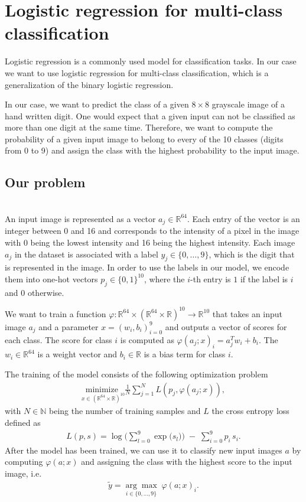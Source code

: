 \section{Logistic regression for multi-class classification}
\label{sec:mathematical-background}
Logistic regression is a commonly used model for classification tasks. In our case we want to use logistic regression for multi-class classification, which is a generalization of the binary logistic regression.

In our case, we want to predict the class of a given $8\times 8$ grayscale image of a hand written digit. One would expect that a given input can not be classified as more than one digit at the same time. Therefore, we want to compute the probability of a given input image to belong to every of the 10 classes (digits from 0 to 9) and assign the class with the highest probability to the input image.

\subsection{Our problem}\;\\
An input image is represented as a vector $a_j \in \mathbb{R}^{64}$. Each entry of the vector is an integer between 0 and 16 and corresponds to the intensity of a pixel in the image with 0 being the lowest intensity and 16 being the highest intensity. Each image $a_j$ in the dataset is associated with a label $y_j \in \{0,\ldots,9\}$, which is the digit that is represented in the image. In order to use the labels in our model, we encode them into one-hot vectors $p_j \in \{0,1\}^{10}$, where the $i$-th entry is $1$ if the label is $i$ and $0$ otherwise.\cite{scikitlearn}

We want to train a function $\varphi: \mathbb{R}^{64} \times (\mathbb{R}^{64}\times \mathbb{R})^{10} \rightarrow \mathbb{R}^{10}$ that takes an input image $a_j$ and a parameter $x=(w_i, b_i)_{i=0}^9$ and outputs a vector of scores for each class. The score for class $i$ is computed as $\varphi(a_j;x)_i = a_j^Tw_i + b_i$. The $w_i \in \mathbb{R}^{64}$ is a weight vector and $b_i \in \mathbb{R}$ is a bias term for class $i$.

The training of the model consists of the following optimization problem 
\begin{align}
    \label{eq:optimization-problem}
    \underset{x\in(\mathbb{R}^{64}\times \mathbb{R})^{10}}{\text{minimize }} \frac{1}{N}\sum_{j=1}^N L(p_j,\varphi(a_j;x)),
\end{align}
with $N\in \mathbb{N}$ being the number of training samples and $L$ the cross entropy loss defined as
\begin{align}
    \label{eq:loss-function}
    L(p,s)=\log\!\Big(\sum_{l=0}^{9} \exp\big(s_l\big)\Big)
    \;-\;
    \sum_{i=0}^{9} p_i\,s_i.
\end{align}
After the model has been trained, we can use it to classify new input images $a$ by computing $\varphi(a;x)$ and assigning the class with the highest score to the input image, i.e.
\begin{align*}
    \tilde{y} = \underset{i\in\{0,\ldots,9\}}{\arg\max}\; \varphi(a;x)_i.
\end{align*}

